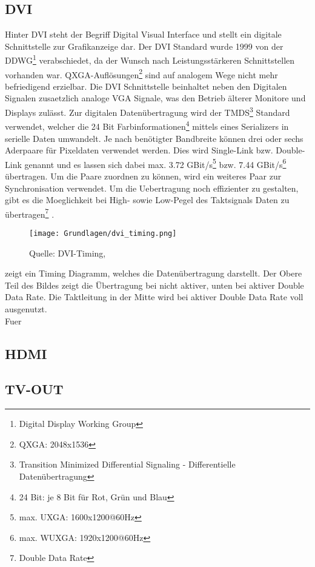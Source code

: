 \subsection{DVI}
Hinter DVI steht der Begriff Digital Visual Interface und stellt ein digitale Schnittstelle zur Grafikanzeige dar. Der DVI Standard wurde 1999 von der DDWG\footnote{Digital Display Working Group} verabschiedet, da der Wunsch nach Leistungsstärkeren Schnittstellen vorhanden war. QXGA-Auflösungen\footnote{QXGA: 2048x1536} sind auf analogem Wege nicht mehr befriedigend erzielbar. Die DVI Schnittstelle beinhaltet neben den Digitalen Signalen zusaetzlich analoge VGA Signale, was den Betrieb älterer Monitore und Displays zulässt. Zur digitalen Datenübertragung wird der TMDS\footnote{Transition Minimized Differential Signaling - Differentielle Datenübertragung} Standard verwendet, welcher die 24 Bit Farbinformationen\footnote{24 Bit: je 8 Bit für Rot, Grün und Blau} mittels eines Serializers in serielle Daten umwandelt. Je nach benötigter Bandbreite können drei oder sechs Aderpaare für Pixeldaten verwendet werden. Dies wird Single-Link bzw. Double-Link genannt und es lassen sich dabei max. 3.72 GBit/s\footnote{max. UXGA: 1600x1200@60Hz} bzw. 7.44 GBit/s\footnote{max. WUXGA: 1920x1200@60Hz} übertragen. Um die Paare zuordnen zu können, wird ein weiteres Paar zur Synchronisation verwendet. Um die Uebertragung noch effizienter zu gestalten, gibt es die Moeglichkeit bei High- sowie Low-Pegel des Taktsignals Daten zu übertragen\footnote{Double Data Rate} \cite{Leunig2002}.

\begin{figure}[hb]
	\centering
	\texttt{[image: Grundlagen/dvi\_timing.png]}
	\caption{Quelle: DVI-Timing, \cite{Wikipedia2010a}}
	\label{fig:dvi_timing}
\end{figure}
\label{fig:dvi_timing} zeigt ein Timing Diagramm, welches die Datenübertragung darstellt. Der Obere Teil des Bildes zeigt die Übertragung bei nicht aktiver, unten bei aktiver Double Data Rate. Die Taktleitung in der Mitte wird bei aktiver Double Data Rate voll ausgenutzt. \\

Fuer 

\subsection{HDMI}

\subsection{TV-OUT}
